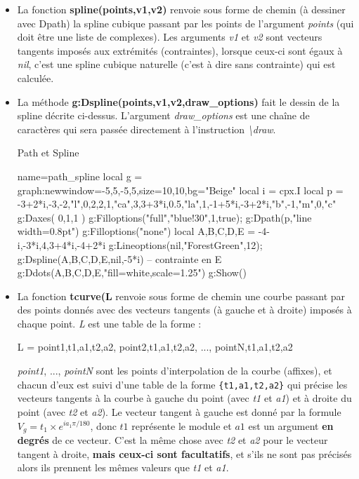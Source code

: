\begin{itemize}
\item La fonction \textbf{spline(points,v1,v2)} renvoie sous forme de chemin (à dessiner avec Dpath) la spline cubique passant par les points de l'argument \emph{points} (qui doit être une liste de complexes). Les arguments \emph{v1} et \emph{v2} sont vecteurs tangents imposés aux extrémités (contraintes), lorsque ceux-ci sont égaux à \emph{nil}, c'est une spline cubique naturelle (c'est à dire sans contrainte) qui est calculée.

\item La méthode \textbf{g:Dspline(points,v1,v2,draw\_options)} fait le dessin de la spline décrite ci-dessus. L'argument \emph{draw\_options} est une chaîne de caractères qui sera passée directement à l'instruction \emph{\textbackslash draw}.

\begin{demo}{Path et Spline}
\begin{luadraw}{name=path_spline}
local g = graph:new{window={-5,5,-5,5},size={10,10},bg="Beige"}
local i = cpx.I
local p = {-3+2*i,-3,-2,"l",0,2,2,1,"ca",3,3+3*i,0.5,"la",1,-1+5*i,-3+2*i,"b",-1,"m",0,"c"}
g:Daxes( {0,1,1} )
g:Filloptions("full","blue!30",1,true); g:Dpath(p,"line width=0.8pt")
g:Filloptions("none")
local A,B,C,D,E = -4-i,-3*i,4,3+4*i,-4+2*i
g:Lineoptions(nil,"ForestGreen",12); g:Dspline({A,B,C,D,E},nil,-5*i) -- contrainte en E
g:Ddots({A,B,C,D,E},"fill=white,scale=1.25")
g:Show()
\end{luadraw}
\end{demo}

\item La fonction \textbf{tcurve(L} renvoie sous forme de chemin une courbe passant par des points donnés avec des vecteurs tangents (à gauche et à droite) imposés à chaque point. \emph{L} est une table de la forme :
\begin{Luacode}
L = {point1,{t1,a1,t2,a2}, point2,{t1,a1,t2,a2}, ..., pointN,{t1,a1,t2,a2}}
\end{Luacode}
\emph{point1}, ..., \emph{pointN} sont les points d'interpolation de la courbe (affixes), et chacun d'eux est suivi d'une table de la forme \verb|{t1,a1,t2,a2}| qui précise les vecteurs tangents à la courbe à gauche du point (avec \emph{t1} et \emph{a1}) et à droite du point (avec \emph{t2} et \emph{a2}). Le vecteur tangent à gauche est donné par la formule $V_g = t_1\times e^{ia_1\pi/180}$, donc $t1$ représente le module et $a1$ est un argument \textbf{en degrés} de ce vecteur. C'est la même chose avec \emph{t2} et \emph{a2} pour le vecteur tangent à droite, \textbf{mais ceux-ci sont facultatifs}, et s'ils ne sont pas précisés alors ils prennent les mêmes valeurs que \emph{t1} et \emph{a1}.


\end{itemize}
